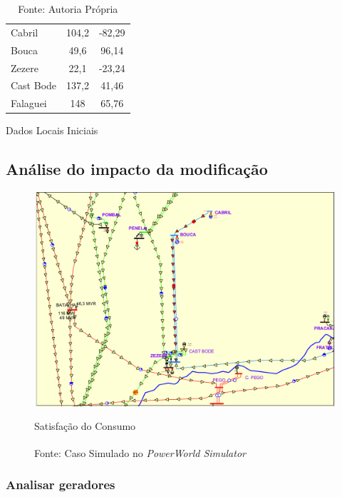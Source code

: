 \begin{table}[]
\begin{tabular}{lcc}
Cabril                              & 104,2                                & -82,29        \\
Bouca                               & 49,6                                 & 96,14         \\
Zezere                              & 22,1                                 & -23,24        \\
Cast Bode                           & 137,2                                & 41,46         \\
Falaguei                            & 148                                  & 65,76        
\end{tabular}
\caption{Dados Locais Iniciais}
  \vspace{-3.5mm}
	\caption*{Fonte: Autoria Própria}
  \label{tab:DadosLocaisIniciais}
\end{table}

\subsection{Análise do impacto da modificação}

\begin{figure}[H]
	\centering
	\captionsetup{width=1\textwidth, font=footnotesize, textfont=bf}	
	\includegraphics[width=1\linewidth]{img/caso1After.pdf}
	\caption{Satisfação do Consumo}
	\vspace{-3.5mm}
	\caption*{Fonte: Caso Simulado no \textit{PowerWorld\textsuperscript{\textregistered} Simulator}}
	\label{fig:caso1After}
\end{figure}

\subsubsection{Analisar geradores}

